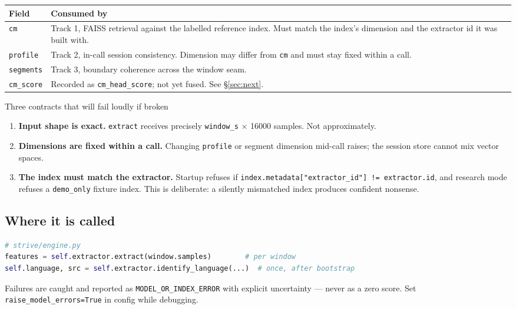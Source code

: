 \documentclass[11pt,a4paper]{article}
\newcommand{\code}[1]{\texttt{\small #1}}
\begin{document}
\begin{center}
\begin{tabular}{@{}lp{10.4cm}@{}}
\toprule
\textbf{Field} & \textbf{Consumed by}\\
\midrule
\code{cm} & Track 1, FAISS retrieval against the labelled reference index. Must match the index's dimension and the extractor id it was built with.\\
\code{profile} & Track 2, in-call session consistency. Dimension may differ from \code{cm} and must stay fixed within a call.\\
\code{segments} & Track 3, boundary coherence across the window seam.\\
\code{cm\_score} & Recorded as \code{cm\_head\_score}; not yet fused. See \S\ref{sec:next}.\\
\bottomrule
\end{tabular}
\end{center}

\begin{warnbox}{Three contracts that will fail loudly if broken}
\begin{enumerate}[nosep,leftmargin=1.4em]
\item \textbf{Input shape is exact.} \code{extract} receives precisely
\code{window\_s} $\times$ 16000 samples. Not approximately.
\item \textbf{Dimensions are fixed within a call.} Changing \code{profile} or
segment dimension mid-call raises; the session store cannot mix vector spaces.
\item \textbf{The index must match the extractor.} Startup refuses if
\code{index.metadata["extractor\_id"] != extractor.id}, and research mode refuses a
\code{demo\_only} fixture index. This is deliberate: a silently mismatched index
produces confident nonsense.
\end{enumerate}
\end{warnbox}

\subsection{Where it is called}

\begin{lstlisting}[language=Python]
# strive/engine.py
features = self.extractor.extract(window.samples)        # per window
self.language, src = self.extractor.identify_language(...)  # once, after bootstrap
\end{lstlisting}

Failures are caught and reported as \code{MODEL\_OR\_INDEX\_ERROR} with explicit
uncertainty --- never as a zero score. Set \code{raise\_model\_errors=True} in
config while debugging.
\end{document}
